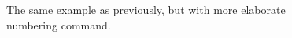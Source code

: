\begin{figure}[h]
    \centering
    
    \caption{
        The same example as previously, but with more elaborate numbering
            command.
        }
    \label{fig:compegg}
\end{figure}

